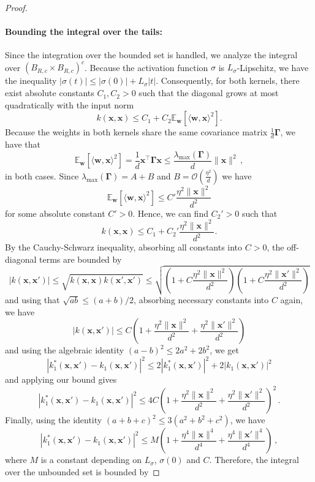 \begin{proof}
    \paragraph{Bounding the integral over the tails:}
    Since the integration over the bounded set is handled, we analyze the integral over $( B_{R, c} \times B_{R, c} )^c$. Because the activation function $\sigma$ is $L_{\sigma}$-Lipschitz, we have the inequality $|\sigma(t)| \le |\sigma(0)| + L_{\sigma}|t|$. Consequently, for both kernels, there exist absolute constants $C_1, C_2 > 0$ such that the diagonal grows at most quadratically with the input norm
    \[
        k(\bm{x}, \bm{x}) \le C_1 + C_2\mathbb E_{\bm w}[\langle \bm w, \bm x\rangle ^2].
    \]
    Because the weights in both kernels share the same covariance matrix $\frac{1}{d}\bm \Gamma$, we have that
    \[
        \mathbb E_{\bm w}[\langle \bm w, \bm x\rangle ^2] = \frac{1}{d}\bm x^\top \bm \Gamma \bm x\leq \frac{\lambda_{\max}(\bm \Gamma)}{d}\|\bm x\|^2\, ,
    \]
    in both cases. Since $\lambda_{\max}(\bm \Gamma) = A+B$ and $B = \mathcal O\left(\frac{\eta^2}{d}\right)$ we have
    \[
         \mathbb E_{\bm w}[\langle \bm w, \bm x\rangle ^2]\leq C'\frac{\eta^2\|\bm x\|^2}{d^2}
    \]
    for some absolute constant $C' > 0$. Hence, we can find $C_2' > 0$ such that
    \[
        k(\bm{x}, \bm{x}) \le C_1 + C_2'\frac{\eta^2\|\bm x\|^2}{d^2}.
    \]
    By the Cauchy-Schwarz inequality, absorbing all constants into $C > 0$, the off-diagonal terms are bounded by
    \[
        |k(\bm x, \bm x')| \le \sqrt{k(\bm x, \bm x) k(\bm x', \bm x')} \le \sqrt{\left(1 + C\frac{\eta^2\|\bm x\|^2}{d^2}\right)\left(1 + C\frac{\eta^2\|\bm x'\|^2}{d^2}\right)}
    \]
    and using that $\sqrt {ab} \leq (a+b)/2$, absorbing necessary constants into $C$ again, we have
    \[
        |k(\bm x, \bm x')| \leq C \left(1 + \frac{\eta^2\|\bm x\|^2}{d^2} + \frac{\eta^2\|\bm x'\|^2}{d^2}\right)
    \]
    and using the algebraic identity $(a-b)^2 \le 2a^2 + 2b^2$, we get
    \[
        |k_1^*(\bm x, \bm x') - k_1(\bm x, \bm x')|^2 \leq 2|k_1^*(\bm x, \bm x')|^2 + 2|k_1(\bm x, \bm x')|^2 
    \]
    and applying our bound gives
    \[
        |k_1^*(\bm x, \bm x') - k_1(\bm x, \bm x')|^2 \leq 4C \left(1 + \frac{\eta^2\|\bm x\|^2}{d^2} + \frac{\eta^2\|\bm x'\|^2}{d^2}\right)^2\, .
    \]
    Finally, using the identity $(a+b+c)^2 \leq 3(a^2 + b^2 + c^2)$, we have
    \[
        |k_1^*(\bm x, \bm x') - k_1(\bm x, \bm x')|^2 \leq M \left(1 + \frac{\eta^4\|\bm x\|^4}{d^4} + \frac{\eta^4\|\bm x'\|^4}{d^4}\right) \, ,
    \]
    where $M$ is a constant depending on $L_{\sigma}$, $\sigma(0)$ and $C$. Therefore, the integral over the unbounded set is bounded by

\end{proof}
